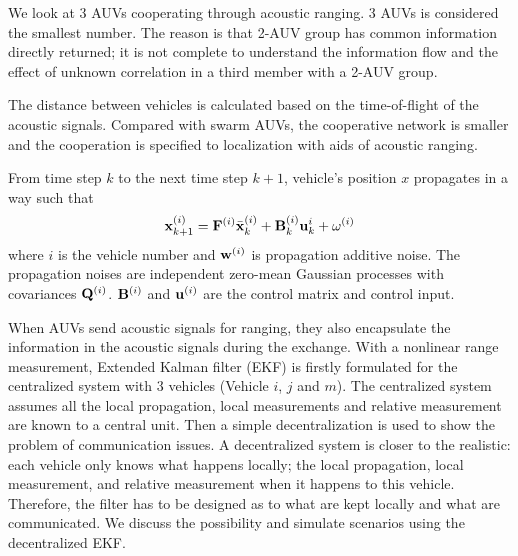 We look at 3 AUVs cooperating through acoustic ranging. 3 AUVs is considered the smallest number. The reason is that 2-AUV group has common information directly returned; it is not complete to understand the information flow and the effect of unknown correlation in a third member with a 2-AUV group.

The distance between vehicles is calculated based on the time-of-flight of the acoustic signals. Compared with swarm AUVs, the cooperative network is smaller and the cooperation is specified to localization with aids of acoustic ranging.

From time step $k$ to the next time step $k+1$, vehicle's position $x$ propagates in a way such that
\begin{equation}
\begin{split}
{\bf x}^{(i)}_{k+1}&={\bf F}^{(i)}\bar{\bf x}^{(i)}_k+{\bf B}^{(i)}_k{\bf u}^{i}_k+{\bf \omega}^{(i)}\\
\end{split}
\end{equation}
where $i$ is the vehicle number and ${\bf w}^{(i)}$ is propagation additive noise. The propagation noises are independent zero-mean Gaussian processes with covariances ${\bf Q}^{(i)}$. ${\bf B}^{(i)}$ and ${\bf u}^{(i)}$ are the control matrix and control input.

When AUVs send acoustic signals for ranging, they also encapsulate the information in the acoustic signals during the exchange. With a nonlinear range measurement, Extended Kalman filter (EKF) \cite{Julier2004} is firstly formulated for the centralized system with 3 vehicles (Vehicle $i$, $j$ and $m$). The centralized system assumes all the local propagation, local measurements and relative measurement are known to a central unit. Then a simple decentralization is used to show the problem of communication issues. A decentralized system is closer to the realistic: each vehicle only knows what happens locally; the local propagation, local measurement, and relative measurement when it happens to this vehicle. Therefore, the filter has to be designed as to what are kept locally and what are communicated. We discuss the possibility and simulate scenarios using the decentralized EKF.

